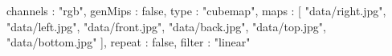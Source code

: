 {
	channels : "rgb",
	genMips : false,
	type : "cubemap",
	maps : [
		"data/right.jpg",
		"data/left.jpg",
		"data/front.jpg",
		"data/back.jpg",
		"data/top.jpg",
		"data/bottom.jpg"
	],
	repeat : false,
	filter : "linear"
}